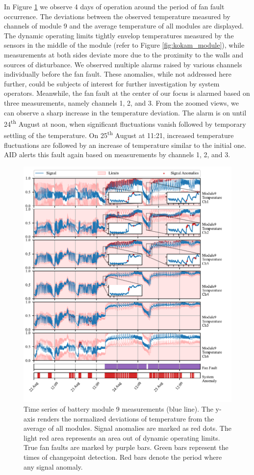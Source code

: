 In Figure \ref{fig:kokam_first} we observe 4 days of operation around the period of fan fault occurrence. The deviations between the observed temperature measured by channels of module 9 and the average temperature of all modules are displayed. The dynamic operating limits tightly envelop temperatures measured by the sensors in the middle of the module (refer to Figure \ref{fig:kokam_module}), while measurements at both sides deviate more due to the proximity to the walls and sources of disturbance. We observed multiple alarms raised by various channels individually before the fan fault. These anomalies, while not addressed here further, could be subjects of interest for further investigation by system operators. Meanwhile, the fan fault at the center of our focus is alarmed based on three measurements, namely channels 1, 2, and 3. From the zoomed views, we can observe a sharp increase in the temperature deviation. The alarm is on until 24\textsuperscript{th} August at noon, when significant fluctuations vanish followed by temporary settling of the temperature. On 25\textsuperscript{th} August at 11:21, increased temperature fluctuations are followed by an increase of temperature similar to the initial one.
AID alerts this fault again based on measurements by channels 1, 2, and 3.

\begin{figure}[htbp]
 \centerline{\includegraphics{figures/Kokam_thresh_first_zoom.pdf}}
 \caption{Time series of battery module 9 measurements (blue line). The y-axis renders the normalized deviations of temperature from the average of all modules. Signal anomalies are marked as red dots. The light red area represents an area out of dynamic operating limits. True fan faults are marked by purple bars. Green bars represent the times of changepoint detection. Red bars denote the period where any signal anomaly.}
 \label{fig:kokam_first}
\end{figure}

